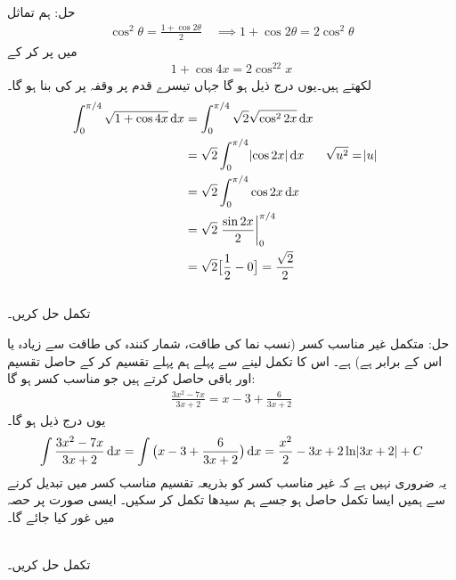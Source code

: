 حل:\quad
ہم تماثل
\begin{align*}
\cos^2\theta=\frac{1+\cos 2\theta}{2}\quad \implies 1+\cos 2\theta=2\cos^2\theta
\end{align*}
میں  پر کر کے 
\begin{align*}
1+\cos 4x=2\cos^22x
\end{align*}
لکھتے ہیں۔یوں درج ذیل ہو گا جہاں تیسرے قدم پر وقفہ  پر  کی بنا  ہو گا۔
\begin{align*}
\int_0^{\pi/4}\sqrt{1+\cos 4x}\dif x&=\int_0^{\pi/4}\sqrt{2}\sqrt{\cos^22x}\dif x\\
&=\sqrt{2}\int_0^{\pi/4}\abs{\cos 2x}\dif x&&\sqrt{u^2}=\abs{u}\\
&=\sqrt{2}\int_0^{\pi/4}\cos 2x\dif x\\
&=\sqrt{2}\left.\frac{\sin 2x}{2}\right\vert_0^{\pi/4}\\
&=\sqrt{2}\big[\frac{1}{2}-0\big]=\frac{\sqrt{2}}{2}
\end{align*}
\\
تکمل  حل کریں۔

حل:\quad 
متکمل غیر مناسب کسر (نسب نما کی طاقت، شمار کنندہ کی طاقت سے زیادہ یا اس کے برابر ہے)  ہے۔ اس کا تکمل لینے سے پہلے ہم پہلے تقسیم کر کے حاصل تقسیم اور باقی حاصل کرتے ہیں جو مناسب کسر ہو گا:
\begin{align*}
\frac{3x^2-7x}{3x+2}=x-3+\frac{6}{3x+2}
\end{align*}
یوں درج ذیل ہو گا۔
\begin{align*}
\int\frac{3x^2-7x}{3x+2}\dif x=\int\big(x-3+\frac{6}{3x+2}\big)\dif x=\frac{x^2}{2}-3x+2\ln\abs{3x+2}+C
\end{align*}
یہ ضروری نہیں ہے کہ غیر مناسب کسر کو بذریعہ تقسیم مناسب  کسر میں تبدیل کرنے سے  ہمیں ایسا تکمل حاصل ہو جسے ہم سیدھا تکمل کر سکیں۔ ایسی صورت پر حصہ میں غور کیا جائے گا۔

\\
تکمل  حل کریں۔

